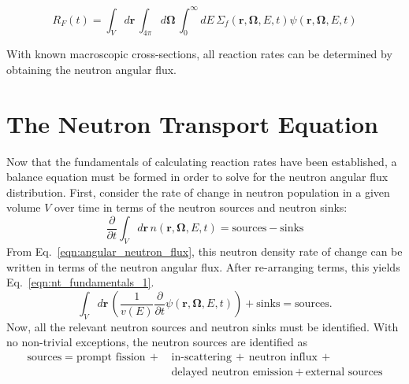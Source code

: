 \begin{equation}
R_{F}(t) = \int_{V} d\mathbf{r} \,  \int_{4\pi} d\mathbf{\Omega} \, \int_{0}^{\infty} dE \, \Sigma_f(\mathbf{r}, \mathbf{\Omega}, E, t) \psi(\mathbf{r}, \mathbf{\Omega}, E, t)
\label{eqn:rr_psi}
\end{equation}

With known macroscopic cross-sections, all reaction rates can be determined by obtaining the neutron angular flux.

\section{The Neutron Transport Equation}
\label{sec:transport-eq}

Now that the fundamentals of calculating reaction rates have been established, a balance equation must be formed in order to solve for the neutron angular flux distribution. First, consider the rate of change in neutron population in a given volume $V$ over time in terms of the neutron sources and neutron sinks:
\begin{equation}
\frac{\partial}{\partial t} \int_V d\mathbf{r} \, n(\mathbf{r},\mathbf{\Omega},E,t) = \text{sources} - \text{sinks}
\end{equation}
From Eq.~\ref{eqn:angular_neutron_flux}, this neutron density rate of change can be written in terms of the neutron angular flux. After re-arranging terms, this yields Eq.~\ref{eqn:nt_fundamentals_1}.
\begin{equation}
\int_V d\mathbf{r} \, \left( \frac{1}{v(E)} \frac{\partial}{\partial t} \psi(\mathbf{r},\mathbf{\Omega},E,t)\right) + \text{sinks} = \text{sources}.
\label{eqn:nt_fundamentals_1}
\end{equation}
Now, all the relevant neutron sources and neutron sinks must be identified. With no non-trivial exceptions, the neutron sources are identified as
\begin{equation}
\begin{split}
\text{sources} = \text{prompt fission} \, + \, & \text{in-scattering} \, +  \, \text{neutron influx} \, + \\ & \text{delayed neutron emission} \, + \, \text{external sources} \\
\end{split}
\end{equation}
